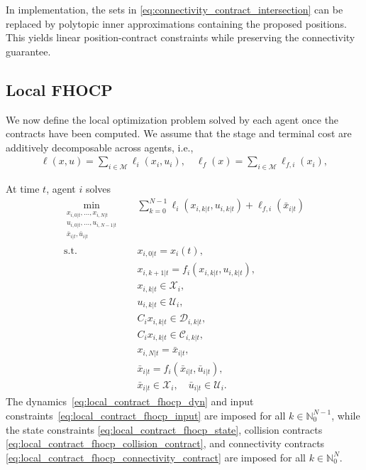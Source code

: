 \documentclass[letterpaper, 10 pt, conference]{ieeeconf}  %
\begin{document}
In implementation, the sets in
\eqref{eq:connectivity_contract_intersection} can be replaced by polytopic inner
approximations containing the proposed positions. This yields linear
position-contract constraints while preserving the connectivity guarantee.


\subsection{Local FHOCP}\label{sec:local_fhocp}

We now define the local optimization problem solved by each agent once the
contracts have been computed. We assume that the stage and terminal cost are additively
decomposable across agents, i.e.,
\begin{align}
	\ell(x,u)=\sum_{i\in\mathcal{M}}\ell_i(x_i,u_i), \quad  \ell_f(x)=\sum_{i\in\mathcal{M}}\ell_{f,i}(x_i),
\end{align}

At time $t$, agent $i$ solves
\begin{subequations}\label{eq:local_contract_fhocp}
	\begin{align}
		\min_{\substack{x_{i,0|t},\ldots,x_{i,N|t}           \\
		u_{i,0|t},\ldots,u_{i,N-1|t}                         \\
		\bar x_{i|t},\bar u_{i|t}}}
		\quad &
		\sum_{k=0}^{N-1}\ell_i(x_{i,k|t},u_{i,k|t})+\ell_{f,i}(\bar{x}_{i|t})
		\label{eq:local_contract_fhocp_cost}
		\\
		\mathrm{s.t.}\quad
		      & x_{i,0|t}=x_i(t),
		\label{eq:local_contract_fhocp_init}
		\\
		      & x_{i,k+1|t}=f_i(x_{i,k|t},u_{i,k|t}),
		\label{eq:local_contract_fhocp_dyn}
		\\
		      & x_{i,k|t}\in\mathcal{X}_i,
		\label{eq:local_contract_fhocp_state}
		\\
		      & u_{i,k|t}\in\mathcal{U}_i,
		\label{eq:local_contract_fhocp_input}
		\\
		      & C_i x_{i,k|t}\in\mathcal{D}_{i,k|t},
		\label{eq:local_contract_fhocp_collision_contract}
		\\
		      & C_i x_{i,k|t}\in\mathcal{C}_{i,k|t},
		\label{eq:local_contract_fhocp_connectivity_contract}
		\\
		      & x_{i,N|t}=\bar x_{i|t},
		\label{eq:local_contract_fhocp_terminal_eq}
		\\
		      & \bar x_{i|t}=f_i(\bar x_{i|t},\bar u_{i|t}),
		\label{eq:local_contract_fhocp_terminal_ss}
		\\
		      & \bar x_{i|t}\in\mathcal{X}_i,\quad
		\bar u_{i|t}\in\mathcal{U}_i.
		\label{eq:local_contract_fhocp_terminal_admissible}
	\end{align}
\end{subequations}
The dynamics~\eqref{eq:local_contract_fhocp_dyn} and input
constraints~\eqref{eq:local_contract_fhocp_input} are imposed for all
$k\in\mathbb{N}_0^{N-1}$, while the state constraints
\eqref{eq:local_contract_fhocp_state}, collision contracts
\eqref{eq:local_contract_fhocp_collision_contract}, and connectivity contracts
\eqref{eq:local_contract_fhocp_connectivity_contract} are imposed for all
$k\in\mathbb{N}_0^{N}$.
\end{document}
